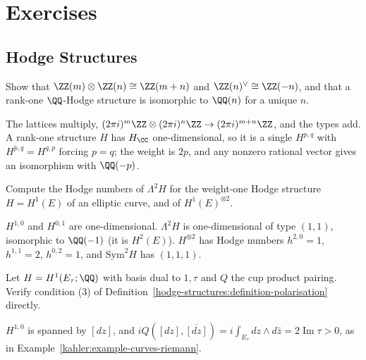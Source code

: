\section{Exercises}\label{hodge-structures:section-exercises}

\subsection{Hodge Structures}\label{hodge-structures:subsection-exercises-hodge-structures}

\begin{exercise}\label{hodge-structures:exercise-tate-tensor}
Show that $\ZZ(m) \otimes \ZZ(n) \cong \ZZ(m + n)$ and $\ZZ(n)^\vee \cong \ZZ(-n)$, and that a rank-one $\QQ$-Hodge structure is isomorphic to $\QQ(n)$ for a unique $n$.
\end{exercise}

\begin{solution}
The lattices multiply, $(2\pi i)^m\ZZ \otimes (2\pi i)^n\ZZ \to (2\pi i)^{m+n}\ZZ$, and the types add. A rank-one structure $H$ has $H_\CC$ one-dimensional, so it is a single $H^{p,q}$ with
$\overline{H^{p,q}} = H^{q,p}$ forcing $p = q$; the weight is $2p$, and any nonzero rational vector gives an isomorphism with $\QQ(-p)$.
\end{solution}

\begin{exercise}\label{hodge-structures:exercise-hodge-numbers-tensor}
Compute the Hodge numbers of $\Lambda^2H$ for the weight-one Hodge structure $H = H^1(E)$ of an elliptic curve, and of $H^1(E)^{\otimes 2}$.
\end{exercise}

\begin{solution}
$H^{1,0}$ and $H^{0,1}$ are one-dimensional. $\Lambda^2H$ is one-dimensional of type $(1,1)$, isomorphic to $\QQ(-1)$ (it is $H^2(E)$). $H^{\otimes 2}$ has Hodge numbers
$h^{2,0} = 1$, $h^{1,1} = 2$, $h^{0,2} = 1$, and $\mathrm{Sym}^2H$ has $(1, 1, 1)$.
\end{solution}

\begin{exercise}\label{hodge-structures:exercise-polarisation-elliptic}
Let $H = H^1(E_\tau; \QQ)$ with basis dual to $1, \tau$ and $Q$ the cup product pairing. Verify condition (3) of Definition~\ref{hodge-structures:definition-polarisation} directly.
\end{exercise}

\begin{solution}
$H^{1,0}$ is spanned by $[dz]$, and $iQ([dz], \overline{[dz]}) = i\int_{E_\tau}dz \wedge d\bar z = 2\operatorname{Im}\tau > 0$, as in Example~\ref{kahler:example-curves-riemann}.
\end{solution}

